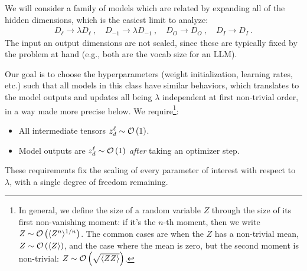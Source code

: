 \documentclass[11pt]{article}
\begin{document}
We will consider a family of models which are related by expanding all of the hidden dimensions, which is
the easiest limit to analyze:
\begin{align}
    D _{\ell } \longrightarrow   \lambda D _{ \ell }\ ,\quad D _{-1 } \longrightarrow   \lambda D _{-1}\ ,\quad D _{O } \longrightarrow   D _{O}\ ,\quad
    D _{I} \longrightarrow   D _{I}\ . \label{app_eq_mup_width_scaling}
\end{align}
The input an output dimensions are not scaled, since these are typically fixed by the problem at
hand (e.g., both are the vocab size for an LLM).

Our goal is to choose the hyperparameters (weight initialization, learning rates, etc.) such that
all models in this class have similar behaviors, which translates to the model outputs and updates
all being $ \lambda  $ independent at first non-trivial order, in a way made more precise below. We
require\footnote{In general, we define the size of a random variable $ Z $ through the size of its first
non-vanishing moment: if it's the $ n $-th moment, then we write $ Z \sim \mathcal{O} \left( \langle Z^{ n
} \rangle^{1/n} \right)$. The common cases are when the $ Z $ has a non-trivial mean,  $ Z \sim
\mathcal{O} \left( \langle Z \rangle \right)$, and the case where the mean is zero, but the second moment
is non-trivial: $ Z \sim \mathcal{O} \left( \sqrt{\langle Z Z \rangle} \right)$.}:
\begin{itemize}
    \item All intermediate tensors $ z ^{ \ell }  _{d  } \sim \mathcal{O} \left( 1 \right)  $.
    \item Model outputs are $ z ^{ \ell } _{ d } \sim \mathcal{O} \left( 1 \right)  $ \textit{after}
        taking an optimizer step.
\end{itemize}
 These requirements fix the scaling of every parameter of interest with respect
to $ \lambda  $, with a single degree of freedom remaining.
\end{document}
